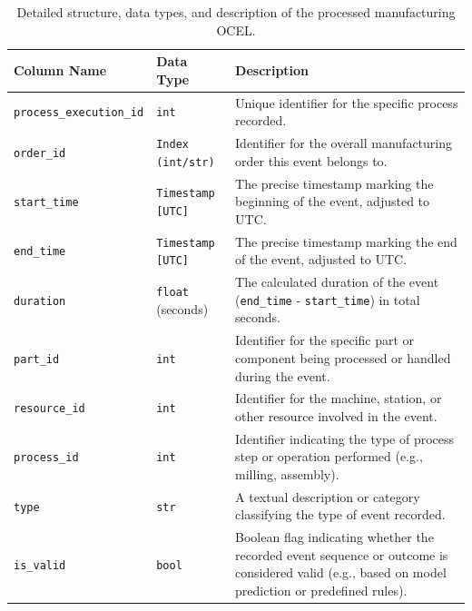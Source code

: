 \begin{table}[htbp]
  \centering
  \caption{Detailed structure, data types, and description of the processed manufacturing OCEL.}
  \label{tab:output-structure-detailed}
  \begin{tabular}{l l p{6cm}} %
    \toprule
    \textbf{Column Name}            & \textbf{Data Type}       & \textbf{Description}                                                                                                                              \\
    \midrule
    \texttt{process\_execution\_id} & \texttt{int}             & Unique identifier for the specific process recorded.                                                                                              \\
    \texttt{order\_id}              & \texttt{Index (int/str)} & Identifier for the overall manufacturing order this event belongs to.                                                                             \\
    \texttt{start\_time}            & \texttt{Timestamp [UTC]} & The precise timestamp marking the beginning of the event, adjusted to UTC.                                                                        \\
    \texttt{end\_time}              & \texttt{Timestamp [UTC]} & The precise timestamp marking the end of the event, adjusted to UTC.                                                                              \\
    \texttt{duration}               & \texttt{float} (seconds) & The calculated duration of the event (\texttt{end\_time} - \texttt{start\_time}) in total seconds.                                                \\
    \texttt{part\_id}               & \texttt{int}             & Identifier for the specific part or component being processed or handled during the event.                                                        \\
    \texttt{resource\_id}           & \texttt{int}             & Identifier for the machine, station, or other resource involved in the event.                                                                     \\
    \texttt{process\_id}            & \texttt{int}             & Identifier indicating the type of process step or operation performed (e.g., milling, assembly).                                                  \\
    \texttt{type}                   & \texttt{str}             & A textual description or category classifying the type of event recorded.                                                                         \\
    \texttt{is\_valid}              & \texttt{bool}            & Boolean flag indicating whether the recorded event sequence or outcome is considered valid (e.g., based on model prediction or predefined rules). \\
    \bottomrule
  \end{tabular}
\end{table}


